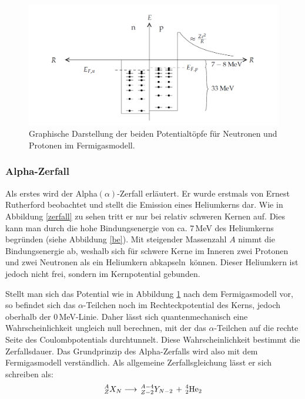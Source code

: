 \begin{figure}[h]
	\centering
	\includegraphics[width=1.0\textwidth]{img/fermigas}
	\caption{Graphische Darstellung der beiden Potentialtöpfe für Neutronen und Protonen im Fermigasmodell. \cite{fermi}}
	\label{fermigas}
\end{figure}

\subsubsection{Alpha-Zerfall}

Als erstes wird der Alpha$\left( \alpha\right) $-Zerfall erläutert. Er wurde erstmals von Ernest Rutherford beobachtet und stellt die Emission eines Heliumkerns dar. Wie in Abbildung \ref{zerfall} zu sehen tritt er nur bei relativ schweren Kernen auf. Dies kann man durch die hohe Bindungsenergie von ca. 7\,MeV des Heliumkerns begründen (siehe Abbildung \ref{be}). Mit steigender Massenzahl $A$ nimmt die Bindungsenergie ab, weshalb sich für schwere Kerne im Inneren zwei Protonen und zwei Neutronen als ein Heliumkern \glqq abkapseln\grqq\ können. Dieser Heliumkern ist jedoch nicht frei, sondern im Kernpotential gebunden. 

\noindent Stellt man sich das Potential wie in Abbildung \ref{fermigas} nach dem Fermigasmodell vor, so befindet sich das $\alpha$-Teilchen noch im Rechteckpotential des Kerns, jedoch oberhalb der 0\,MeV-Linie. Daher lässt sich quantenmechanisch eine Wahrscheinlichkeit ungleich null berechnen, mit der das $\alpha$-Teilchen auf die rechte Seite des Coulombpotentials durchtunnelt. Diese Wahrscheinlichkeit bestimmt die Zerfallsdauer. Das Grundprinzip des Alpha-Zerfalls wird also mit dem Fermigasmodell verständlich. Als allgemeine Zerfallsgleichung lässt er sich schreiben als:
\begin{align*}
^A_ZX_N\longrightarrow \,^{A-4}_{Z-2}Y_{N-2} \,+ \,^4_2\textnormal{He}_2
\end{align*}


